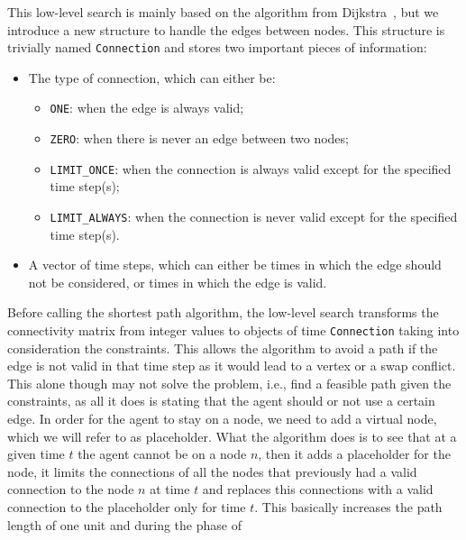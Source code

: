 \subsubsection{}
\label{ssec:tdsp}
This low-level search is mainly based on the algorithm from 
Dijkstra~\cite{dijkstra}, but we introduce a new structure to handle the edges 
between nodes. \newline
This structure is trivially named \texttt{Connection} and stores two important 
pieces of information:
\begin{itemize}
  \item The type of connection, which can either be:
    \begin{itemize}
      \item \texttt{ONE}: when the edge is always valid;
      \item \texttt{ZERO}: when there is never an edge between two nodes;
      \item \texttt{LIMIT\_ONCE}: when the connection is always valid except for
        the specified time step(s);
      \item \texttt{LIMIT\_ALWAYS}: when the connection is never valid except
        for the specified time step(s).
    \end{itemize}
  \item A vector of time steps, which can either be times in which the edge
    should not be considered, or times in which the edge is valid. 
\end{itemize}
Before calling the shortest path algorithm, the low-level search transforms the
connectivity matrix from integer values to objects of time \texttt{Connection}
taking into consideration the constraints. This allows the algorithm to avoid a
path if the edge is not valid in that time step as it would lead to a vertex or
a swap conflict. \newline
This alone though may not solve the problem, i.e., find a feasible path given
the constraints, as all it does is stating that the agent should or not use a
certain edge. In order for the agent to stay on a node, we need to add a
virtual node, which we will refer to as placeholder. What the algorithm does is
to see that at a given time $t$ the agent cannot be on a node $n$, then it adds
a placeholder for the node, it limits the connections of all the nodes that
previously had a valid connection to the node $n$ at time $t$ and replaces this
connections with a valid connection to the placeholder only for time $t$. This
basically increases the path length of one unit and during the phase of
